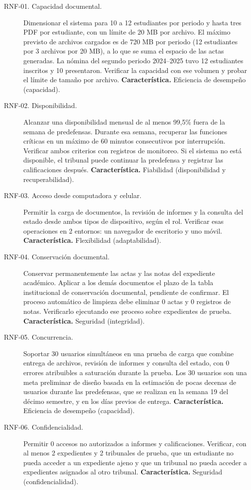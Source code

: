 \begin{description}
    \item[RNF-01. Capacidad documental.] Dimensionar el sistema para 10 a
    12 estudiantes por periodo y hasta tres PDF por estudiante, con un límite
    de 20 MB por archivo. El máximo previsto de archivos cargados es de
    720 MB por periodo (12 estudiantes por 3 archivos por 20 MB), a lo que
    se suma el espacio de las actas generadas. La nómina del segundo periodo
    2024--2025 tuvo 12 estudiantes inscritos y 10 presentaron. Verificar la
    capacidad con ese volumen y probar el límite de tamaño por archivo.
    \textbf{Característica.} Eficiencia de desempeño (capacidad).

    \item[RNF-02. Disponibilidad.] Alcanzar una disponibilidad mensual de al
    menos 99,5\% fuera de la semana de predefensas. Durante esa semana,
    recuperar las funciones críticas en un máximo de 60 minutos consecutivos
    por interrupción. Verificar ambos criterios con registros de monitoreo.
    Si el sistema no está disponible, el tribunal puede continuar la
    predefensa y registrar las calificaciones después.
    \textbf{Característica.} Fiabilidad (disponibilidad y recuperabilidad).

    \item[RNF-03. Acceso desde computadora y celular.] Permitir la carga de
    documentos, la revisión de informes y la consulta del estado desde
    ambos tipos de dispositivo, según el rol. Verificar esas operaciones
    en 2 entornos: un navegador de escritorio y uno móvil.
    \textbf{Característica.} Flexibilidad (adaptabilidad).

    \item[RNF-04. Conservación documental.] Conservar permanentemente las
    actas y las notas del expediente académico. Aplicar a los demás
    documentos el plazo de la tabla institucional de conservación
    documental, pendiente de confirmar. El proceso automático de limpieza
    debe eliminar 0 actas y 0 registros de notas. Verificarlo ejecutando
    ese proceso sobre expedientes de prueba.
    \textbf{Característica.} Seguridad (integridad).

    \item[RNF-05. Concurrencia.] Soportar 30 usuarios simultáneos en una
    prueba de carga que combine entrega de archivos, revisión de informes y
    consulta del estado, con 0 errores atribuibles a saturación durante la
    prueba. Los 30 usuarios son una meta preliminar de diseño basada en la
    estimación de pocas decenas de usuarios durante las predefensas, que se realizan en la semana 19 del décimo semestre, y en los días previos de entrega.
    \textbf{Característica.} Eficiencia de desempeño (capacidad).

    \item[RNF-06. Confidencialidad.] Permitir 0 accesos no autorizados a
    informes y calificaciones. Verificar, con al menos 2 expedientes y
    2 tribunales de prueba, que un estudiante no pueda acceder a un
    expediente ajeno y que un tribunal no pueda acceder a expedientes
    asignados al otro tribunal.
    \textbf{Característica.} Seguridad (confidencialidad).
\end{description}
